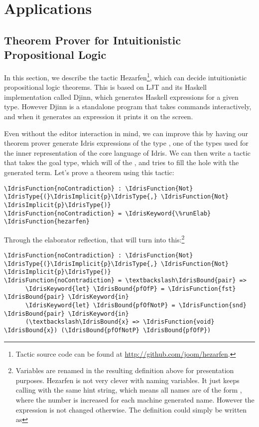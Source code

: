 \section{Applications} \label{sec:applications}

\subsection{Theorem Prover for Intuitionistic Propositional Logic}

In this section, we describe the tactic Hezarfen\footnote{Tactic source code
can be found at \url{http://github.com/joom/hezarfen}.}, which can decide
intuitionistic propositional logic theorems. This is based on LJT\cite{ljt}
and its Haskell implementation called Djinn\cite{djinn}, which generates
Haskell expressions for a given type. However Djinn is a standalone program
that takes commands interactively, and when it generates an expression it
prints it on the screen.

Even without the editor interaction in mind, we can improve this by having our
theorem prover generate Idris expressions of the type , one of the
types used for the inner representation of the core language of Idris.
We can then write a tactic that takes the goal type, which will of the
, and tries to fill the hole with the generated term.
Let's prove a theorem using this tactic:

\begin{Verbatim}
\IdrisFunction{noContradiction} : \IdrisFunction{Not} \IdrisType{(}\IdrisImplicit{p}\IdrisType{,} \IdrisFunction{Not} \IdrisImplicit{p}\IdrisType{)}
\IdrisFunction{noContradiction} = \IdrisKeyword{\%runElab} \IdrisFunction{hezarfen}
\end{Verbatim}

Through the elaborator reflection, that will turn into this:\footnote{
  Variables are renamed in the resulting definition above for presentation
  purposes. Hezarfen is not very clever with naming variables. It just keeps
  calling  with the same hint string, which means all names are
  of the form   , where the number is increased
  for each machine generated name. However the expression is not
  changed otherwise. The definition could simply be written as

 }
\begin{Verbatim}
\IdrisFunction{noContradiction} : \IdrisFunction{Not} \IdrisType{(}\IdrisImplicit{p}\IdrisType{,} \IdrisFunction{Not} \IdrisImplicit{p}\IdrisType{)}
\IdrisFunction{noContradiction} = \textbackslash\IdrisBound{pair} =>
      \IdrisKeyword{let} \IdrisBound{pfOfP} = \IdrisFunction{fst} \IdrisBound{pair} \IdrisKeyword{in}
      \IdrisKeyword{let} \IdrisBound{pfOfNotP} = \IdrisFunction{snd} \IdrisBound{pair} \IdrisKeyword{in}
      (\textbackslash\IdrisBound{x} => \IdrisFunction{void} \IdrisBound{x}) (\IdrisBound{pfOfNotP} \IdrisBound{pfOfP})
\end{Verbatim}

